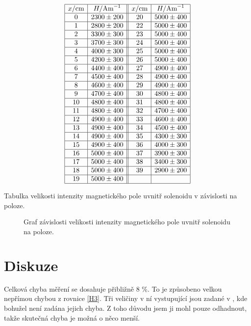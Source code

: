 \documentclass[a4paper,12pt]{article}
\begin{document}
\begin{table}
$$
\begin{array}{|c|c||c|c|}
\hline
x/\mbox{cm}&    H/\mbox{Am}^{-1}&   x/\mbox{cm}&    H/\mbox{Am}^{-1} \\ \hline
0&   2300\pm    200&20&  5000\pm    400 \\ \hline
1&   2800\pm    200&22&  5000\pm    400 \\ \hline
2&   3300\pm    300&23&  5000\pm    400 \\ \hline
3&   3700\pm    300&24&  5000\pm    400 \\ \hline
4&   4000\pm    300&25&  5000\pm    400 \\ \hline
5&   4200\pm    300&26&  5000\pm    400 \\ \hline
6&   4400\pm    400&27&  4900\pm    400 \\ \hline
7&   4500\pm    400&28&  4900\pm    400 \\ \hline
8&   4600\pm    400&29&  4900\pm    400 \\ \hline
9&   4700\pm    400&30&  4800\pm    400 \\ \hline
10&  4800\pm    400&31&  4800\pm    400 \\ \hline
11&  4800\pm    400&32&  4700\pm    400 \\ \hline
12&  4900\pm    400&33&  4600\pm    400 \\ \hline
13&  4900\pm    400&34&  4500\pm    400 \\ \hline
14&  4900\pm    400&35&  4300\pm    300 \\ \hline
15&  4900\pm    400&36&  4000\pm    300 \\ \hline
16&  5000\pm    400&37&  3900\pm    300 \\ \hline
17&  5000\pm    400&38&  3400\pm    300 \\ \hline
18&  5000\pm    400&39&  2900\pm    200 \\ \hline
19&  5000\pm    400&& \\ \hline
\end{array}
$$
\caption{Tabulka velikosti intenzity magnetického pole uvnitř solenoidu v závislosti na poloze.}
\label{sol}
\end{table}
\begin{figure}

\caption{Graf závislosti velikosti intenzity magnetického pole uvnitř solenoidu na poloze.}
\label{g5}
\end{figure}

\section{Diskuze}
Celková chyba měření se dosahuje přibližně 8 \%. To je způsobeno velkou nepřímou chybou z rovnice \ref{H3}. Tři veličiny v ní vystupující 
jsou zadané v \cite{text}, kde bohužel není zadána jejich chyba. Z toho důvodu jsem ji mohl pouze odhadnout, takže skutečná chyba je možná 
o něco menší. 
\end{document}
